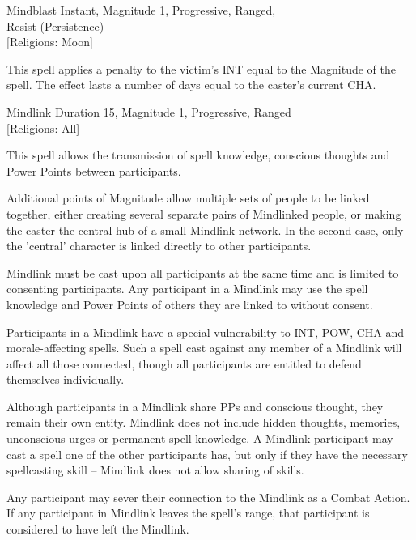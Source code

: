 \begin{rpg-spell}
{Mindblast}
{Instant, Magnitude 1, Progressive, Ranged,\\Resist (Persistence)\\{[Religions: Moon]}}

This spell applies a penalty to the victim’s INT equal to the Magnitude of the spell. The effect lasts a number of days equal to the caster’s current CHA. 
\end{rpg-spell}

\begin{rpg-spell}
{Mindlink}
{Duration 15, Magnitude 1, Progressive, Ranged\\{[Religions: All]}}

This spell allows the transmission of spell knowledge, conscious thoughts and Power Points between participants. 

Additional points of Magnitude allow multiple sets of people to be linked together, either creating several separate pairs of Mindlinked people, or making the caster the central hub of a small Mindlink network. In the second case, only the 'central' character is linked directly to other participants. 

Mindlink must be cast upon all participants at the same time and is limited to consenting participants. Any participant in a Mindlink may use the spell knowledge and Power Points of others they are linked to without consent. 

Participants in a Mindlink have a special vulnerability to INT, POW, CHA and morale-affecting spells. Such a spell cast against any member of a Mindlink will affect all those connected, though all participants are entitled to defend themselves individually. 

Although participants in a Mindlink share PPs and conscious thought, they remain their own entity. Mindlink does not include hidden thoughts, memories, unconscious urges or permanent spell knowledge. A Mindlink participant may cast a spell one of the other participants has, but only if they have the necessary spellcasting skill – Mindlink does not allow sharing of skills. 

Any participant may sever their connection to the Mindlink as a Combat Action. If any participant in Mindlink leaves the spell’s range, that participant is considered to have left the Mindlink. 
\end{rpg-spell}

